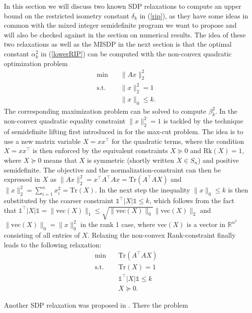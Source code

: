 \documentclass[journal]{IEEEtran}
\newcommand{\abs}[1]{\lvert{#1}\rvert}
\newcommand{\Norm}[2]{\lVert{#1}\rVert_{#2}}
\newcommand{\T}{^{\top}}
\newcommand{\Tr}{\text{Tr}}
\newcommand{\Rk}{\text{Rk}}
\newcommand{\vect}{\text{vec}}
\newcommand{\R}{\mathds{R}}
\newcommand{\ones}{\mathds{1}}
\begin{document}
In this section we will discuss two known SDP relaxations to compute an upper bound on the restricted isometry constant $\delta_k$ in (\ref{rip}), as they have some ideas in common with the mixed integer semidefinite program we want to 
propose and will also be checked against in the section on numerical results. The idea of these two relaxations as well as the MISDP in the next section is that the optimal constant $\alpha_k^2$ in (\ref{lowerRIP}) can be computed
with the non-convex quadratic optimization problem
\begin{align}\label{QP}
 \min \quad & \Norm{Ax}{2}^2 \nonumber \\
 \text{s.t.} \quad & \Norm{x}{2}^2 = 1 \tag{QP} \\
 & \Norm{x}{0} \leq k. \nonumber
\end{align}
The corresponding maximization problem can be solved to compute $\beta_k^2$. In \cite{Asp07} the non-convex quadratic equality constraint $\Norm{x}{2}^2 = 1$ is tackled by the technique of semidefinite lifting first introduced in \cite{GW95} 
for the max-cut problem. The idea is to use a new matrix variable $X=xx\T$ for the quadratic terms, where the condition $X=xx\T$ is then enforced by the equivalent constraints $X \succeq 0$ and $\Rk(X) = 1$, where 
$X \succeq 0$ means that $X$ is symmetric (shortly written \mbox{$X \in S_n$}) and positive semidefinite. The objective and the normalization-constraint can then be expressed in $X$ as  $\Norm{Ax}{2}^2 = x\T A\T Ax =
\Tr(A\T A X)$ and $\Norm{x}{2}^2 = \sum_{i=1}^n x_i^2 = \Tr(X)$. In the
next step the inequality $\Norm{x}{0} \leq k$ is then substituted by the coarser constraint $\ones\T
\abs{X} \ones \leq k$, which follows from the fact that $\ones\T\abs{X} \ones = \Norm{\vect(X)}{1}\leq \sqrt{\Norm{\vect(X)}{0}} \Norm{\vect(X)}{2}$ and $\Norm{\vect(X)}{0}=\Norm{x}{0}^2$ in the rank 1 case, where $\vect(X)$ is a vector
in $\R^{n^2}$ consisting of all entries of $X$. 
Relaxing the non-convex Rank-constraint finally leads to the following relaxation:
\begin{align}\label{Asp07}
 \min \quad & \Tr(A\T A X) \nonumber \\
 \text{s.t.} \quad & \Tr(X) = 1 \nonumber \\
 & \ones\T \abs{X} \ones \leq k \tag{A1} \\
 & X \succeq 0. \nonumber
\end{align}

Another SDP relaxation was proposed in \cite{Asp08}. There the problem
\end{document}
